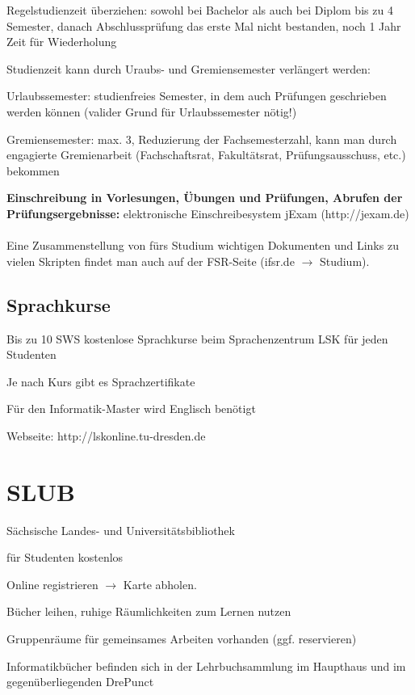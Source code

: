 \documentclass[a4paper,12pt]{report}
\begin{document}
\begin{itemize*}
	\item Regelstudienzeit überziehen: sowohl bei Bachelor als auch bei Diplom bis zu 4 Semester, danach Abschlussprüfung das erste Mal nicht bestanden, noch 1 Jahr Zeit für Wiederholung
	\item Studienzeit kann durch Uraubs- und Gremiensemester verlängert werden:
	\begin{itemize*}
		\item Urlaubssemester: studienfreies Semester, in dem auch Prüfungen geschrieben werden können (valider Grund für Urlaubssemester nötig!)
		\item Gremiensemester: max. 3, Reduzierung der Fachsemesterzahl, kann man durch engagierte Gremienarbeit (Fachschaftsrat, Fakultätsrat, Prüfungsausschuss, etc.) bekommen
	\end{itemize*}
\end{itemize*}

\textbf{Einschreibung in Vorlesungen, Übungen und Prüfungen, Abrufen der Prüfungsergebnisse: }elektronische Einschreibesystem jExam (http://jexam.de)\\\\
Eine Zusammenstellung von fürs Studium wichtigen Dokumenten und Links zu vielen Skripten findet man auch auf der FSR-Seite (ifsr.de $\rightarrow$ Studium).

\subsection{Sprachkurse}
\begin{itemize*}
\item Bis zu 10 SWS kostenlose Sprachkurse beim Sprachenzentrum LSK für jeden Studenten
\item Je nach Kurs gibt es Sprachzertifikate
\item Für den Informatik-Master wird Englisch benötigt
\item Webseite: http://lskonline.tu-dresden.de
\end{itemize*}

\section{SLUB}
\begin{itemize*}
	\item Sächsische Landes- und Universitätsbibliothek
	\item für Studenten kostenlos
	\item Online registrieren $\rightarrow$ Karte abholen.
	\item Bücher leihen, ruhige Räumlichkeiten zum Lernen nutzen
	\item Gruppenräume für gemeinsames Arbeiten vorhanden (ggf. reservieren)
	\item Informatikbücher befinden sich in der Lehrbuchsammlung im Haupthaus und im gegenüberliegenden \glqq DrePunct\grqq
\end{itemize*}
\end{document}
